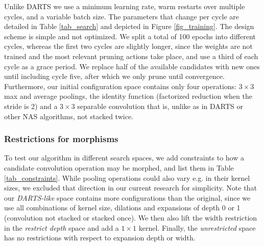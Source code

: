 \documentclass[conference]{IEEEtran}
\begin{document}
Unlike DARTS we use a minimum learning rate, warm restarts over multiple cycles, and a variable batch size. The parameters that change per cycle are detailed in Table \ref{tab_search} and depicted in Figure \ref{fig_training}. The design scheme is simple and not optimized.
We split a total of 100 epochs into different cycles, whereas the first two cycles are slightly longer, since the weights are not trained and the most relevant pruning actions take place, and use a third of each cycle as a grace period.
We replace half of the available candidates with new ones until including cycle five, after which we only prune until convergence.
Furthermore, our initial configuration space contains only four operations: $3 \times 3$ max and average poolings, the identity function (factorized reduction when the stride is 2) and a $3 \times 3$ separable convolution that is, unlike as in DARTS or other NAS algorithms, not stacked twice.


\subsubsection*{Restrictions for morphisms}

To test our algorithm in different search spaces, we add constraints to how a candidate convolution operation may be morphed, and list them in Table \ref{tab_constraints}. While pooling operations could also vary e.g. in their kernel sizes, we excluded that direction in our current research for simplicity.
Note that our \textit{DARTS-like} space contains more configurations than the original, since we use all combinations of kernel size, dilations and expansions of depth 0 or 1 (convolution not stacked or stacked once).
We then also lift the width restriction in the \textit{restrict depth} space and add a $1 \times 1$ kernel.
Finally, the \textit{unrestricted} space has no restrictions with respect to expansion depth or width.
\end{document}
